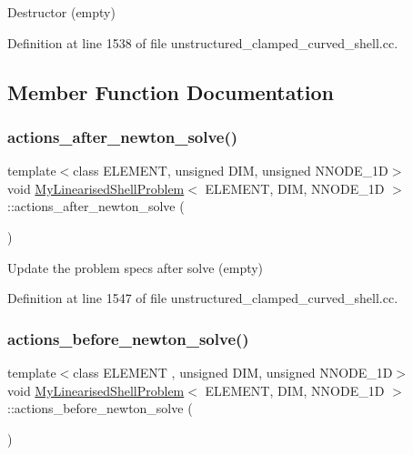 Destructor (empty) 



Definition at line 1538 of file unstructured\+\_\+clamped\+\_\+curved\+\_\+shell.\+cc.



\subsection{Member Function Documentation}
\mbox{\label{classMyLinearisedShellProblem_a8ad6606f22859a5bd32d238bcc10efd1}} 
\subsubsection{\texorpdfstring{actions\+\_\+after\+\_\+newton\+\_\+solve()}{actions\_after\_newton\_solve()}}
{\footnotesize\ttfamily template$<$class E\+L\+E\+M\+E\+NT, unsigned D\+IM, unsigned N\+N\+O\+D\+E\+\_\+1D$>$ \\
void \hyperlink{classMyLinearisedShellProblem}{My\+Linearised\+Shell\+Problem}$<$ E\+L\+E\+M\+E\+NT, D\+IM, N\+N\+O\+D\+E\+\_\+1D $>$\+::actions\+\_\+after\+\_\+newton\+\_\+solve (\begin{DoxyParamCaption}{ }\end{DoxyParamCaption})\hspace{0.3cm}{\ttfamily [inline]}}



Update the problem specs after solve (empty) 



Definition at line 1547 of file unstructured\+\_\+clamped\+\_\+curved\+\_\+shell.\+cc.

\mbox{\label{classMyLinearisedShellProblem_a81d050ee6958694b7645ea73cc8e4e9f}} 
\subsubsection{\texorpdfstring{actions\+\_\+before\+\_\+newton\+\_\+solve()}{actions\_before\_newton\_solve()}}
{\footnotesize\ttfamily template$<$class E\+L\+E\+M\+E\+NT , unsigned D\+IM, unsigned N\+N\+O\+D\+E\+\_\+1D$>$ \\
void \hyperlink{classMyLinearisedShellProblem}{My\+Linearised\+Shell\+Problem}$<$ E\+L\+E\+M\+E\+NT, D\+IM, N\+N\+O\+D\+E\+\_\+1D $>$\+::actions\+\_\+before\+\_\+newton\+\_\+solve (\begin{DoxyParamCaption}{ }\end{DoxyParamCaption})}



